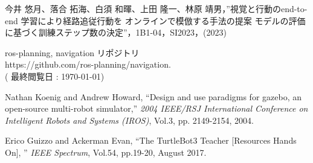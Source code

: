 \documentclass{jarticle}
\begin{document}
\begin{thebibliography}{99}
今井 悠月、落合 拓海、白須 和暉、上田 隆一、林原 靖男，”視覚と行動のend-to-end 学習により経路追従行動を
オンラインで模倣する手法の提案 モデルの評価に基づく訓練ステップ数の決定”，1B1-04，SI2023，(2023)

ros-planning, navigation リポジトリ\\
https://github.com/ros-planning/navigation.\\
( 最終閲覧日 : \today )

Nathan Koenig and Andrew Howard, “Design and use paradigms for gazebo, an
open-source multi-robot simulator,” \textit{2004 IEEE/RSJ International Conference
on Intelligent Robots and Systems (IROS)}, Vol.3, pp.
2149-2154, 2004.

Erico Guizzo and Ackerman Evan, “The TurtleBot3 Teacher [Resources Hands On],
” \textit{IEEE Spectrum}, Vol.54, pp.19-20, August 2017.
\vspace*{2mm}


\end{thebibliography}

\normalsize
\end{document}
